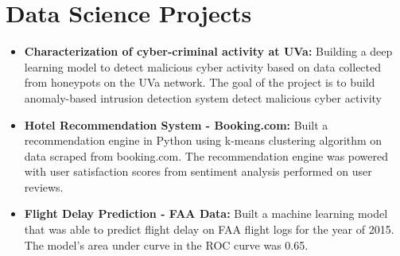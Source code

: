 \documentclass[11pt,a4paper,cambria]{moderncv}        %
\begin{document}
\begin{itemize}[leftmargin=0.0in]



\end{itemize}

\section{Data Science Projects}



\begin{itemize}[leftmargin=.2in]
\setlength\itemsep{.2em}

\item \textbf{Characterization of cyber-criminal activity at UVa:} Building a deep learning model to detect malicious cyber activity based on data collected from honeypots on the UVa network. The goal of the project is to build anomaly-based intrusion detection system detect malicious cyber activity
\vspace{-1pt}

\item \textbf{Hotel Recommendation System - Booking.com:} Built a recommendation engine in Python using k-means clustering algorithm on data scraped from booking.com. The recommendation engine was powered with user satisfaction scores from sentiment analysis performed on user reviews.
\vspace{-1pt}

\item \textbf{Flight Delay Prediction - FAA Data:} Built a machine learning model that was able to predict flight delay on FAA flight logs for the year of 2015. The model's area under curve in the ROC curve was 0.65.
\vspace{-1pt}

 \end{itemize}
\end{document}
